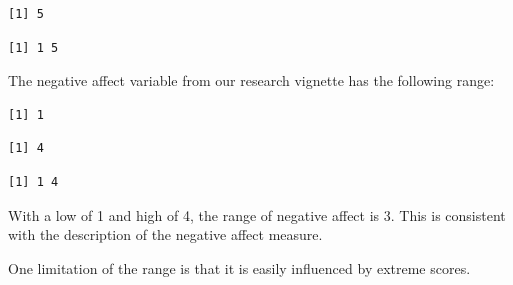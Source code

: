 \documentclass[
  11pt,
]{book}
\newenvironment{Shaded}{\begin{snugshade}}{\end{snugshade}}
\newcommand{\AttributeTok}[1]{\textcolor[rgb]{0.77,0.63,0.00}{#1}}
\newcommand{\ConstantTok}[1]{\textcolor[rgb]{0.00,0.00,0.00}{#1}}
\newcommand{\FunctionTok}[1]{\textcolor[rgb]{0.00,0.00,0.00}{#1}}
\newcommand{\NormalTok}[1]{#1}
\newcommand{\SpecialCharTok}[1]{\textcolor[rgb]{0.00,0.00,0.00}{#1}}
\begin{document}
\begin{verbatim}
[1] 5
\end{verbatim}

\begin{Shaded}
\end{Shaded}

\begin{verbatim}
[1] 1 5
\end{verbatim}

The negative affect variable from our research vignette has the following range:

\begin{Shaded}
\end{Shaded}

\begin{verbatim}
[1] 1
\end{verbatim}

\begin{Shaded}
\end{Shaded}

\begin{verbatim}
[1] 4
\end{verbatim}

\begin{Shaded}
\end{Shaded}

\begin{verbatim}
[1] 1 4
\end{verbatim}

With a low of 1 and high of 4, the range of negative affect is 3. This is consistent with the description of the negative affect measure.

One limitation of the range is that it is easily influenced by extreme scores.
\end{document}
